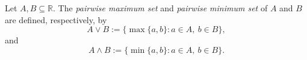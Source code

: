 \begin{definition}
\label{def:pairwise-maximum-minimum-sets}
Let $A,B\subseteq\mathbb{R}$.  The \emph{pairwise maximum set} and
\emph{pairwise minimum set} of $A$ and $B$ are defined, respectively, by
\[
  A\vee B:=\{\max\{a,b\}:a\in A,\ b\in B\},
\]
and
\[
  A\wedge B:=\{\min\{a,b\}:a\in A,\ b\in B\}.
\]
\end{definition}